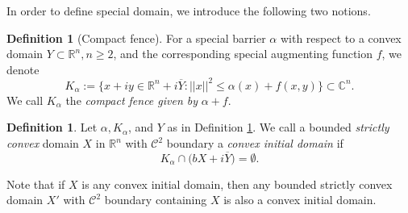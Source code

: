 \documentclass[12pt,reqno, a4paper]{amsart}
\theoremstyle{definition}
\theoremstyle{definition}
\newtheorem{definition}[theorem]{Definition}
\numberwithin{equation}{section}
\def\R{\mathbb{R}}                              %
\def\C{\mathbb{C}}                              %
\begin{document}
In order to define special domain, we introduce the following two notions.
\begin{definition}[Compact fence]\label{compact-fence}
For a special barrier $\alpha$ with respect to a convex domain $Y\subset \R^n, n\geq 2$, and the corresponding special augmenting function $f$, we denote 
\begin{equation}\label{kalpha}
	K_{\alpha} := \{x+iy \in \R^n+i \overline{Y} : ||x||^2\leq \alpha(x)+f(x,y)\}\subset \C^n.
\end{equation}
We call $K_{\alpha}$ the \textit{compact fence given by} $\alpha+f$. 
\end{definition}
\begin{definition}\label{convex-initial-domain}
Let $\alpha, K_{\alpha}$, and $Y$ as in Definition \ref{compact-fence}. We call a bounded \textit{strictly convex} domain $X$ in $\R^n$ with $\mathcal{C}^2$ boundary a \textit{convex initial domain} if 
\begin{equation}\label{cvx_initial}
 K_{\alpha} \cap \big(bX+i \overline{Y}\big) =\emptyset.
\end{equation}
\end{definition}
Note that if $X$ is any convex initial domain, then any bounded strictly convex domain $X'$ with $\mathcal{C}^2$ boundary containing $X$ is also a convex initial domain.
\end{document}
